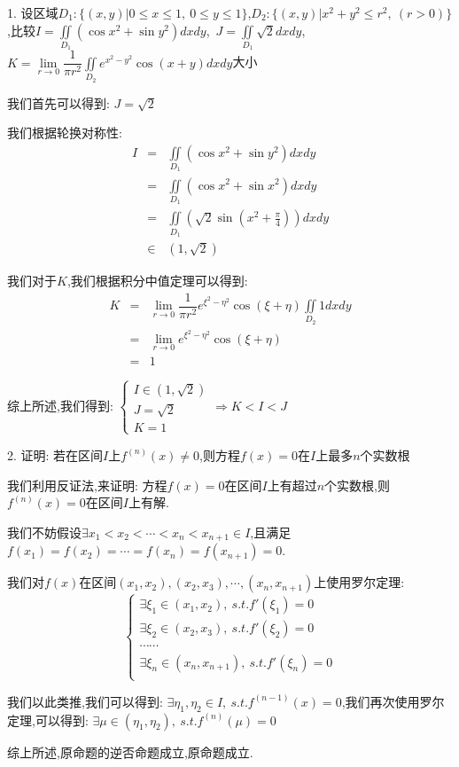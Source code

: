 1. 设区域$D_{1}:\{(x,y)| 0\leq x\leq 1,\ 0\leq y\leq 1\}$,$D_{2}:\{(x,y)| x^2+y^2\leq r^2,\ (r>0)\}$,比较$I=\iint \limits_{D_{1}}\left(\cos x^2+\sin y^2\right) dxdy$,\ $J=\iint\limits_{D_{1}}\sqrt{2}dxdy$,\ $K=\lim\limits_{r\to 0}\dfrac{1}{\pi r^2}\iint\limits_{D_{2}}e^{x^2-y^2}\cos(x+y)dxdy$大小
\begin{solution}

	我们首先可以得到:  $J=\sqrt{2}$
	
	我们根据轮换对称性:  
	\begin{eqnarray*}
		I&=&\iint \limits_{D_{1}}\left(\cos x^2+\sin y^2\right) dxdy\\
		&=&\iint \limits_{D_{1}}\left(\cos x^2+\sin x^2\right) dxdy\\
		&=&\iint \limits_{D_{1}}\left(\sqrt{2}\sin(x^2+\frac{\pi}{4})\right)dxdy\\
		&\in&(1,\sqrt{2})
	\end{eqnarray*}

	我们对于$K$,我们根据积分中值定理可以得到:  
	\begin{eqnarray*}
		K&=&\lim\limits_{r\to 0}\dfrac{1}{\pi r^2}e^{\xi^2-\eta^2}\cos(\xi+\eta)\iint\limits_{D_{2}}1dxdy\\
		&=&\lim\limits_{r\to 0}e^{\xi^2-\eta^2}\cos(\xi+\eta)\\
		&=&1
	\end{eqnarray*}

	综上所述,我们得到:  $\left\lbrace
	\begin{array}{l}
		I\in(1,\sqrt{2})\\
		J=\sqrt{2}\\
		K=1
	\end{array}
	\right.\Rightarrow K<I<J$
\end{solution}

2. 证明:  若在区间$I$上$f^{(n)}(x)\neq 0$,则方程$f(x)=0$在$I$上最多$n$个实数根
\begin{solution}

	我们利用反证法,来证明:  方程$f(x)=0$在区间$I$上有超过$n$个实数根,则$f^{(n)}(x)=0$在区间$I$上有解.
	
	我们不妨假设$\exists x_{1}<x_{2}<\cdots<x_{n}<x_{n+1}\in I$,且满足$f(x_{1})=f(x_{2})=\cdots=f(x_{n})=f(x_{n+1})=0$.
	
	我们对$f(x)$在区间$(x_{1},x_{2}),(x_{2},x_{3}),\cdots,(x_{n},x_{n+1})$上使用罗尔定理:  
	$$\left\lbrace
	\begin{array}{l}
		\exists \xi_{1}\in(x_{1},x_{2}),\ s.t. f'(\xi_{1})=0\\
		\exists \xi_{2}\in(x_{2},x_{3}),\ s.t. f'(\xi_{2})=0\\
		\cdots\cdots\\
		\exists \xi_{n}\in(x_{n},x_{n+1}),\ s.t. f'(\xi_{n})=0\\	
	\end{array}
	\right. $$
	
	我们以此类推,我们可以得到:  $\exists\eta_{1},\eta_{2}\in I,\ s.t. f^{(n-1)}(x)=0$,我们再次使用罗尔定理,可以得到:  
	$\exists \mu\in(\eta_{1},\eta_{2}),\ s.t. f^{(n)}(\mu)=0$
	
	综上所述,原命题的逆否命题成立,原命题成立.
\end{solution}

